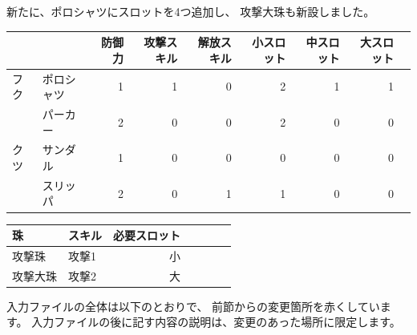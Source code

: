 \documentclass[dvipdfmx]{jsarticle}
\begin{document}
新たに、ポロシャツにスロットを4つ追加し、
攻撃大珠も新設しました。
\medskip
%
\begin{center}
\begin{tabular}{llrrrrrrr}
\toprule
&& 防御力 & 攻撃スキル & 解放スキル & 小スロット& 中スロット& 大スロット\\
\midrule
フク
& ポロシャツ & 1 & 1 & 0 & 2 & 1 & 1\\
& パーカー   & 2 & 0 & 0 & 2 & 0 & 0\\
\midrule
クツ
& サンダル & 1 & 0 & 0 & 0 & 0 & 0\\
& スリッパ & 2 & 0 & 1 & 1 & 0 & 0\\
\bottomrule
\end{tabular}
\end{center}
%
\begin{center}
\begin{tabular}{llrrrrr}
\toprule
珠 & スキル & 必要スロット \\
\midrule
攻撃珠 & 攻撃1 & 小\\
攻撃大珠 & 攻撃2 & 大\\
\bottomrule
\end{tabular}
\end{center}
%
入力ファイルの全体は以下のとおりで、
前節からの変更箇所を赤くしています。
入力ファイルの後に記す内容の説明は、変更のあった場所に限定します。
\medskip
\end{document}

